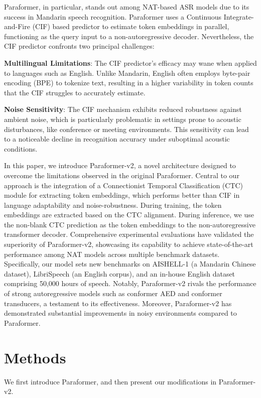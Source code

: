 \documentclass[runningheads]{llncs}
\begin{document}
Paraformer, in particular, stands out among NAT-based ASR models due to its success in Mandarin speech recognition. Paraformer uses a Continuous Integrate-and-Fire (CIF) based predictor to estimate token embeddings in parallel, functioning as the query input to a non-autoregressive decoder. Nevertheless, the CIF predictor confronts two principal challenges:

\textbf{Multilingual Limitations}: The CIF predictor's efficacy may wane when applied to languages such as English. Unlike Mandarin, English often employs byte-pair encoding (BPE) to tokenize text, resulting in a higher variability in token counts that the CIF struggles to accurately estimate.

\textbf{Noise Sensitivity}: The CIF mechanism exhibits reduced robustness against ambient noise, which is particularly problematic in settings prone to acoustic disturbances, like conference or meeting environments. This sensitivity can lead to a noticeable decline in recognition accuracy under suboptimal acoustic conditions.

In this paper, we introduce Paraformer-v2, a novel architecture designed to overcome the limitations observed in the original Paraformer. Central to our approach is the integration of a Connectionist Temporal Classification (CTC) module for extracting token embeddings, which performs better than CIF in language adaptability and noise-robustness. During training, the token embeddings are extracted based on the CTC alignment. During inference, we use the non-blank CTC prediction as the token embeddings to the non-autoregressive transformer decoder. Comprehensive experimental evaluations have validated the superiority of Paraformer-v2, showcasing its capability to achieve state-of-the-art performance among NAT models across multiple benchmark datasets. Specifically, our model sets new benchmarks on AISHELL-1 (a Mandarin Chinese dataset), LibriSpeech (an English corpus), and an in-house English dataset comprising 50,000 hours of speech. Notably, Paraformer-v2 rivals the performance of strong autoregressive models such as conformer AED and conformer transducers, a testament to its effectiveness. Moreover, Paraformer-v2 has demonstrated substantial improvements in noisy environments compared to Paraformer. 

\section{Methods}
We first introduce Paraformer, and then present our modifications in Paraformer-v2.
\end{document}
